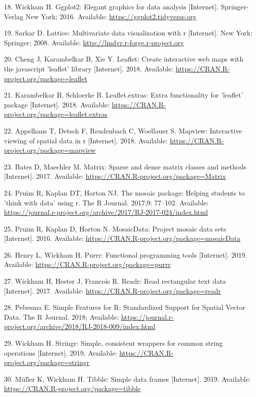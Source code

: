 \documentclass[10pt,letterpaper]{article}
\begin{document}
\hypertarget{ref-R-ggplot2}{}
18. Wickham H. Ggplot2: Elegant graphics for data analysis
{[}Internet{]}. Springer-Verlag New York; 2016. Available:
\url{https://ggplot2.tidyverse.org}

\hypertarget{ref-R-lattice}{}
19. Sarkar D. Lattice: Multivariate data visualization with r
{[}Internet{]}. New York: Springer; 2008. Available:
\url{http://lmdvr.r-forge.r-project.org}

\hypertarget{ref-R-leaflet}{}
20. Cheng J, Karambelkar B, Xie Y. Leaflet: Create interactive web maps
with the javascript 'leaflet' library {[}Internet{]}. 2018. Available:
\url{https://CRAN.R-project.org/package=leaflet}

\hypertarget{ref-R-leaflet.extras}{}
21. Karambelkar B, Schloerke B. Leaflet.extras: Extra functionality for
'leaflet' package {[}Internet{]}. 2018. Available:
\url{https://CRAN.R-project.org/package=leaflet.extras}

\hypertarget{ref-R-mapview}{}
22. Appelhans T, Detsch F, Reudenbach C, Woellauer S. Mapview:
Interactive viewing of spatial data in r {[}Internet{]}. 2018.
Available: \url{https://CRAN.R-project.org/package=mapview}

\hypertarget{ref-R-Matrix}{}
23. Bates D, Maechler M. Matrix: Sparse and dense matrix classes and
methods {[}Internet{]}. 2017. Available:
\url{https://CRAN.R-project.org/package=Matrix}

\hypertarget{ref-R-mosaic}{}
24. Pruim R, Kaplan DT, Horton NJ. The mosaic package: Helping students
to 'think with data' using r. The R Journal. 2017;9: 77--102. Available:
\url{https://journal.r-project.org/archive/2017/RJ-2017-024/index.html}

\hypertarget{ref-R-mosaicData}{}
25. Pruim R, Kaplan D, Horton N. MosaicData: Project mosaic data sets
{[}Internet{]}. 2016. Available:
\url{https://CRAN.R-project.org/package=mosaicData}

\hypertarget{ref-R-purrr}{}
26. Henry L, Wickham H. Purrr: Functional programming tools
{[}Internet{]}. 2019. Available:
\url{https://CRAN.R-project.org/package=purrr}

\hypertarget{ref-R-readr}{}
27. Wickham H, Hester J, Francois R. Readr: Read rectangular text data
{[}Internet{]}. 2017. Available:
\url{https://CRAN.R-project.org/package=readr}

\hypertarget{ref-R-sf}{}
28. Pebesma E. Simple Features for R: Standardized Support for Spatial
Vector Data. The R Journal. 2018; Available:
\url{https://journal.r-project.org/archive/2018/RJ-2018-009/index.html}

\hypertarget{ref-R-stringr}{}
29. Wickham H. Stringr: Simple, consistent wrappers for common string
operations {[}Internet{]}. 2019. Available:
\url{https://CRAN.R-project.org/package=stringr}

\hypertarget{ref-R-tibble}{}
30. Müller K, Wickham H. Tibble: Simple data frames {[}Internet{]}.
2019. Available: \url{https://CRAN.R-project.org/package=tibble}

\nolinenumbers
\end{document}
